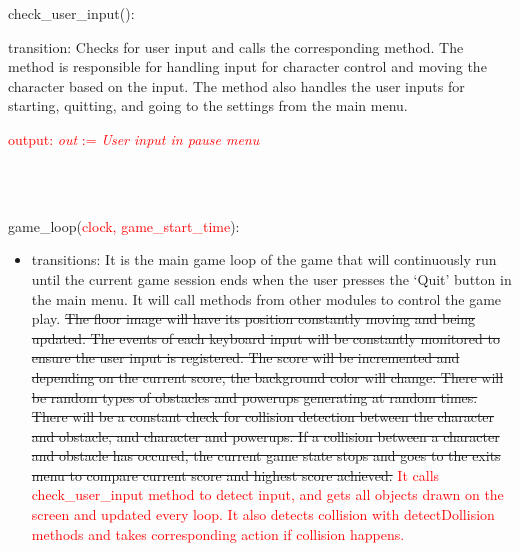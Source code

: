 \documentclass[12pt]{article}
\begin{document}
\noindent check\_user\_input():
\begin{itemize}
    \item transition: Checks for user input and calls the corresponding method. The method is responsible for handling input for character control and moving the character based on the input. The method also handles the user inputs for starting, quitting, and going to the settings from the main menu. 
    \textcolor{red}{\item output: \textit{out} := \textit{User input in pause menu}}\\\\
\end{itemize}

\noindent game\_loop(\textcolor{red}{clock, game\_start\_time}):
\begin{itemize}
    \item transitions: It is the main game loop of the game that will continuously run until the current game session ends when the user presses the `Quit' button in the main menu. It will call methods from other modules to control the game play. \sout{The floor image will have its position constantly moving and being updated. The events of each keyboard input will be constantly monitored to ensure the user input is registered. The score will be incremented and depending on the current score, the background color will change. There will be random types of obstacles  and powerups generating at random times. There will be a constant check for collision detection between the character and obstacle, and character and powerups. If a collision between a character and obstacle has occured, the current game state stops and goes to the exits menu to compare current score and highest score achieved.} \textcolor{red}{It calls check\_user\_input method to detect input, and gets all objects drawn on the screen and updated every loop. It also detects collision with detectDollision methods and takes corresponding action if collision happens.} 
\end{itemize}
\end{document}
